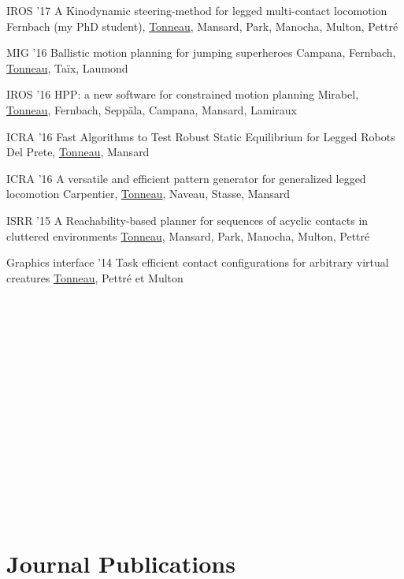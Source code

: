\documentclass{tccv}
\begin{document}
\begin{eventlist}

\item{IROS '17}
{ A Kinodynamic steering-method for legged multi-contact locomotion}
{Fernbach (my PhD student), \underline{Tonneau}, Mansard, Park, Manocha, Multon, Pettr\'e}

\item{MIG '16}
{Ballistic motion planning for jumping superheroes}
{Campana, Fernbach, \underline{Tonneau}, Ta\"ix, Laumond}

\item{IROS '16}
{HPP: a new software for constrained motion planning }
{Mirabel, \underline{Tonneau}, Fernbach, Sepp\"ala, Campana, Mansard, Lamiraux}

\item{ICRA '16}
{Fast Algorithms to Test Robust Static Equilibrium for Legged Robots}
{Del Prete, \underline{Tonneau},  Mansard}

\item{ICRA '16}
{A versatile and efficient pattern generator for generalized legged locomotion}
{Carpentier, \underline{Tonneau}, Naveau, Stasse,  Mansard}

\item{ISRR '15}
{A Reachability-based planner for sequences
of acyclic contacts in cluttered environments}
{\underline{Tonneau}, Mansard, Park, Manocha, Multon, Pettr\'e}

\item
 {Graphics interface '14}
 {Task efficient contact configurations for 
arbitrary virtual creatures}
 {\underline{Tonneau}, Pettr\'e et Multon} \\ \\ \\ \\ \\ \\ \\ \\ \\ \\ \\ \\ \\ \\ \\ \\


\end{eventlist}

\section{Journal Publications}
\end{document}
